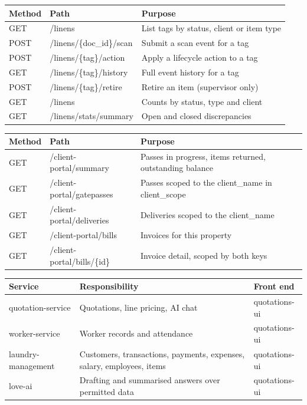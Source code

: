 \documentclass[11pt,a4paper,oneside]{book}
\begin{document}
\begin{center}\small
\begin{tabularx}{\linewidth}{|X|X|X|}
\hline
\rowcolor{lightgrey}
\textbf{Method} & \textbf{Path} & \textbf{Purpose} \\ \hline
GET & /linens & List tags by status, client or item type \\ \hline
POST & /linens/\{doc\_id\}/scan & Submit a scan event for a tag \\ \hline
POST & /linens/\{tag\}/action & Apply a lifecycle action to a tag \\ \hline
GET & /linens/\{tag\}/history & Full event history for a tag \\ \hline
POST & /linens/\{tag\}/retire & Retire an item (supervisor only) \\ \hline
GET & /linens & Counts by status, type and client \\ \hline
GET & /linens/stats/summary & Open and closed discrepancies \\ \hline
\end{tabularx}
\end{center}
\begin{center}\small
\begin{tabularx}{\linewidth}{|X|X|X|}
\hline
\rowcolor{lightgrey}
\textbf{Method} & \textbf{Path} & \textbf{Purpose} \\ \hline
GET & /client-portal/summary & Passes in progress, items returned, outstanding balance \\ \hline
GET & /client-portal/gatepasses & Passes scoped to the client\_name in client\_scope \\ \hline
GET & /client-portal/deliveries & Deliveries scoped to the client\_name \\ \hline
GET & /client-portal/bills & Invoices for this property \\ \hline
GET & /client-portal/bills/\{id\} & Invoice detail, scoped by both keys \\ \hline
\end{tabularx}
\end{center}
\begin{center}\small
\begin{tabularx}{\linewidth}{|X|X|X|}
\hline
\rowcolor{lightgrey}
\textbf{Service} & \textbf{Responsibility} & \textbf{Front end} \\ \hline
quotation-service & Quotations, line pricing, AI chat & quotations-ui \\ \hline
worker-service & Worker records and attendance & quotations-ui \\ \hline
laundry-management & Customers, transactions, payments, expenses, salary, employees, items & quotations-ui \\ \hline
love-ai & Drafting and summarised answers over permitted data & quotations-ui \\ \hline
\end{tabularx}
\end{center}
\end{document}
